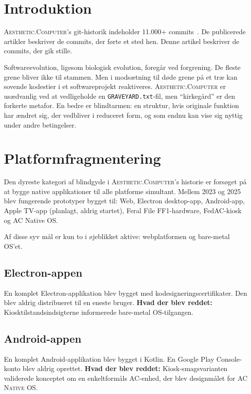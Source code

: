 \documentclass[10pt,letterpaper,twocolumn]{article}
\newcommand{\ac}{\textsc{Aesthetic.Computer}}
\newcommand{\acos}{\textsc{AC Native OS}}
\begin{document}
\section{Introduktion}

\ac{}'s git-historik indeholder 11.000+ commits~\citep{scudder2026archaeology}. De publicerede artikler beskriver de commits, der førte et sted hen. Denne artikel beskriver de commits, der gik stille.

Softwareevolution, ligesom biologisk evolution, foregår ved forgrening. De fleste grene bliver ikke til stammen. Men i modsætning til døde grene på et træ kan sovende kodestier i et softwareprojekt reaktiveres. \ac{} er usædvanlig ved at vedligeholde en \texttt{GRAVEYARD.txt}-fil, men ``kirkegård'' er den forkerte metafor. En bedre er blindtarmen: en struktur, hvis originale funktion har ændret sig, der vedbliver i reduceret form, og som endnu kan vise sig nyttig under andre betingelser.

\section{Platformfragmentering}
\label{sec:fragmentation}

Den dyreste kategori af blindgyde i \ac{}'s historie er forsøget på at bygge native applikationer til alle platforme simultant. Mellem 2023 og 2025 blev fungerende prototyper bygget til: Web, Electron desktop-app, Android-app, Apple TV-app (planlagt, aldrig startet), Feral File FF1-hardware, FedAC-kiosk og AC Native OS.

Af disse syv mål er kun to i øjeblikket aktive: webplatformen og bare-metal OS'et.

\subsection{Electron-appen}

En komplet Electron-applikation blev bygget med kodesigneringscertifikater. Den blev aldrig distribueret til en eneste bruger. \textbf{Hvad der blev reddet:} Kiosktilstandsindsigterne informerede bare-metal OS-tilgangen.

\subsection{Android-appen}

En komplet Android-applikation blev bygget i Kotlin. En Google Play Console-konto blev aldrig oprettet. \textbf{Hvad der blev reddet:} Kiosk-smagsvarianten validerede konceptet om en enkeltformåls AC-enhed, der blev designmålet for \acos{}.
\end{document}
